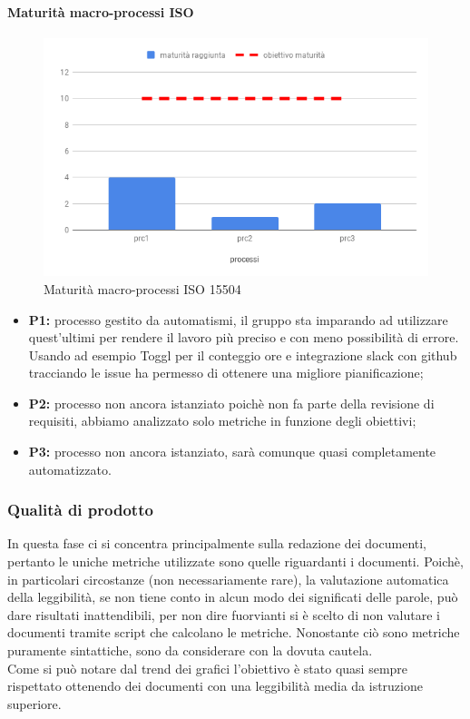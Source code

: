 \paragraph{Maturità macro-processi ISO }
\hspace{15cm}
\begin{figure}[h!]
	\centering
	\includegraphics[scale=0.5]{MaturitaProcessi.png}
	\caption{Maturità macro-processi ISO 15504}
\end{figure}
\begin{itemize}
	\item \textbf{P1:} processo gestito da automatismi, il gruppo sta imparando ad utilizzare quest'ultimi per rendere il lavoro più preciso e con meno possibilità di errore. Usando ad esempio Toggl per il conteggio ore e integrazione slack con github tracciando le issue ha
	permesso di ottenere una migliore pianificazione;
	\item \textbf{P2:} processo non ancora istanziato poichè non fa parte della revisione di requisiti, abbiamo analizzato solo metriche in funzione degli obiettivi;
	\item \textbf{P3:} processo non ancora istanziato, sarà comunque quasi completamente automatizzato.
\end{itemize}
\clearpage
\subsubsection{Qualità di prodotto}
In questa fase ci si concentra principalmente sulla redazione dei documenti, pertanto le uniche metriche utilizzate sono quelle riguardanti i documenti.
Poichè, in particolari circostanze (non necessariamente rare), la valutazione automatica della leggibilità, se non tiene conto in alcun modo dei significati delle parole, può dare risultati inattendibili, per non dire fuorvianti si è scelto di non valutare i documenti tramite script che calcolano le metriche.
Nonostante ciò sono metriche puramente sintattiche, sono da considerare con la dovuta cautela. \\
Come si può notare dal trend dei grafici l'obiettivo è stato quasi sempre rispettato ottenendo dei documenti con una leggibilità media da istruzione superiore.
	\clearpage
